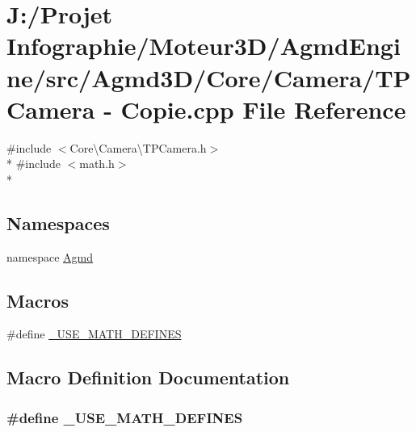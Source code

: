 \hypertarget{_t_p_camera_01-_01_copie_8cpp}{\section{J\-:/\-Projet Infographie/\-Moteur3\-D/\-Agmd\-Engine/src/\-Agmd3\-D/\-Core/\-Camera/\-T\-P\-Camera -\/ Copie.\-cpp File Reference}
\label{_t_p_camera_01-_01_copie_8cpp}
}
{\ttfamily \#include $<$Core\textbackslash{}\-Camera\textbackslash{}\-T\-P\-Camera.\-h$>$}\\*
{\ttfamily \#include $<$math.\-h$>$}\\*
\subsection*{Namespaces}
\begin{DoxyCompactItemize}
\item 
namespace \hyperlink{namespace_agmd}{Agmd}
\end{DoxyCompactItemize}
\subsection*{Macros}
\begin{DoxyCompactItemize}
\item 
\#define \hyperlink{_t_p_camera_01-_01_copie_8cpp_a525335710b53cb064ca56b936120431e}{\-\_\-\-U\-S\-E\-\_\-\-M\-A\-T\-H\-\_\-\-D\-E\-F\-I\-N\-E\-S}
\end{DoxyCompactItemize}


\subsection{Macro Definition Documentation}
\hypertarget{_t_p_camera_01-_01_copie_8cpp_a525335710b53cb064ca56b936120431e}{
\subsubsection[{\-\_\-\-U\-S\-E\-\_\-\-M\-A\-T\-H\-\_\-\-D\-E\-F\-I\-N\-E\-S}]{\setlength{\rightskip}{0pt plus 5cm}\#define \-\_\-\-U\-S\-E\-\_\-\-M\-A\-T\-H\-\_\-\-D\-E\-F\-I\-N\-E\-S}}\label{_t_p_camera_01-_01_copie_8cpp_a525335710b53cb064ca56b936120431e}
